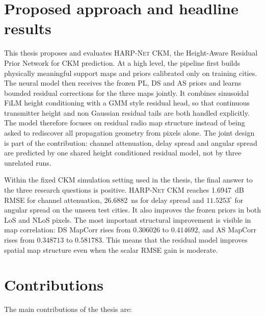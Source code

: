 \section{Proposed approach and headline results}

This thesis proposes and evaluates \textsc{HARP-Net CKM}, the Height-Aware
Residual Prior Network for CKM prediction. At a high level, the pipeline first
builds physically meaningful support maps and priors calibrated only on
training cities. The neural model then receives the frozen PL, DS and AS priors
and learns bounded residual corrections for the three maps jointly. It combines
sinusoidal FiLM height conditioning with a GMM style residual head, so that
continuous transmitter height and non Gaussian residual tails are both handled
explicitly. The model therefore focuses on residual radio map structure instead
of being asked to rediscover all propagation geometry from pixels alone.
The joint design is part of the contribution: channel attenuation, delay spread
and angular spread are predicted by one shared height conditioned residual
model, not by three unrelated runs.

Within the fixed CKM simulation setting used in the thesis, the final answer to
the three research questions is positive. \textsc{HARP-Net CKM} reaches
\SI{1.6947}{dB} RMSE for channel attenuation, \SI{26.6882}{ns} for delay
spread and \(11.5253^\circ\) for angular spread on the unseen test cities. It
also improves the frozen priors in both LoS and NLoS pixels. The most important
structural improvement is visible in map correlation: DS MapCorr rises from
\(0.306026\) to \(0.414692\), and AS MapCorr rises from \(0.348713\) to
\(0.581783\). This means that the residual model improves spatial map structure
even when the scalar RMSE gain is moderate.

\section{Contributions}

The main contributions of the thesis are:

